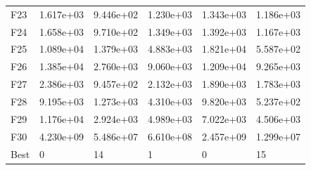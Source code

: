 \begin{tabular}{llllll}
F23  &  1.617e+03 &  9.446e+02 &  1.230e+03 &  1.343e+03 &  1.186e+03 \\
F24  &  1.658e+03 &  9.710e+02 &  1.349e+03 &  1.392e+03 &  1.167e+03 \\
F25  &  1.089e+04 &  1.379e+03 &  4.883e+03 &  1.821e+04 &  5.587e+02 \\
F26  &  1.385e+04 &  2.760e+03 &  9.060e+03 &  1.209e+04 &  9.265e+03 \\
F27  &  2.386e+03 &  9.457e+02 &  2.132e+03 &  1.890e+03 &  1.783e+03 \\
F28  &  9.195e+03 &  1.273e+03 &  4.310e+03 &  9.820e+03 &  5.237e+02 \\
F29  &  1.176e+04 &  2.924e+03 &  4.989e+03 &  7.022e+03 &  4.506e+03 \\
F30  &  4.230e+09 &  5.486e+07 &  6.610e+08 &  2.457e+09 &  1.299e+07 \\
Best &          0 &         14 &          1 &          0 &         15 \\
\bottomrule
\end{tabular}
